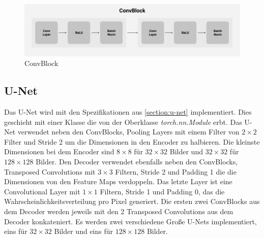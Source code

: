 \begin{figure}[H]
  \centering
  \includegraphics[width=1\textwidth]{resources/networks/convblock.png}
  \caption{
  ConvBlock
  }
  \label{image:convBlock}
\end{figure}

\subsection{U-Net}
Das U-Net wird mit den Spezifikationen aus \ref{section:u-net} implementiert. Dies geschieht mit einer Klasse die von der Oberklasse
\textit{torch.nn.Module} erbt. Das U-Net verwendet neben den ConvBlocks, Pooling Layers mit einem Filter von $2 \times 2$ Filter und Stride 2
um die Dimensionen in den Encoder zu halbieren. Die kleinste Dimensionen bei dem Encoder sind $8 \times 8$ für $32 \times 32$ Bilder und 
$32 \times 32$ für $128 \times 128$ Bilder. Den Decoder verwendet ebenfalls neben den ConvBlocks, Transposed Convolutions mit $3 \times 3$ 
Filtern, Stride 2 und Padding 1 die die Dimensionen von den Feature Maps verdoppeln. Das letzte Layer ist eine Convolutional Layer mit $1 \times 1$ Filtern, Stride 1 und Padding 0, das die 
Wahrscheinlichkeitsverteilung pro Pixel generiert. Die ersten zwei ConvBlocks aus dem Decoder werden jeweils mit den 2 Transposed Convolutions
aus dem Decoder konkateniert. Es werden zwei verschiedene Große U-Nets implementiert, eins für $32 \times 32$ Bilder und eins für 
$128 \times 128$ Bilder.
